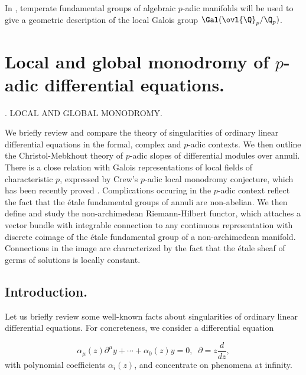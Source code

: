  \medskip{} In \cite{andre:_une_gal}, temperate fundamental
 groups of algebraic $p$-adic manifolds will be used to give a geometric 
 description of the local Galois group $\Gal(\ovl{\Q}_p/\Q_p)$. 
 
\newpage

\section{Local and global monodromy of $p$-adic differential
 equations.}\label{sec::3}

%
{\thesection. LOCAL AND GLOBAL MONODROMY.}

\begin{abst}
We briefly review and compare the theory of singularities of ordinary
linear differential equations in the formal, complex and $p$-adic
contexts. We then outline the Christol-Mebkhout theory of $p$-adic
slopes of differential modules over annuli. There is a close relation
with Galois representations of local fields of characteristic $p$,
expressed by Crew's $p$-adic local monodromy conjecture, which has been
recently proved \cite{andre01:_filtr_hasse_arf}. Complications occuring in the $p$-adic
context reflect the fact that the \'etale fundamental groups of annuli
are non-abelian.  \hfill\break We then define and study the
non-archimedean Riemann-Hilbert functor, which attaches a vector bundle
with integrable connection to any continuous representation with
discrete coimage of the \'etale fundamental group of a non-archimedean
manifold.  Connections in the image are characterized by the fact that
the \'etale sheaf of germs of solutions is locally constant.
\end{abst}


\subsection{Introduction.}\label{sub::3.1}

\begin{para}\label{para::3.1.1} Let us briefly review some well-known facts
 about singularities of ordinary linear differential equations. For
 concreteness, we consider a differential equation   

 \begin{equation}
  \alpha_\mu(z) \partial^\mu y + \cdots + \alpha_0 (z)
   y =0,\;\; \partial=z\frac{d}{dz}, \tag{$\ast$}
 \end{equation}
 with polynomial coefficients $\alpha_i(z)$, and concentrate on
 phenomena at infinity.
\end{para}

